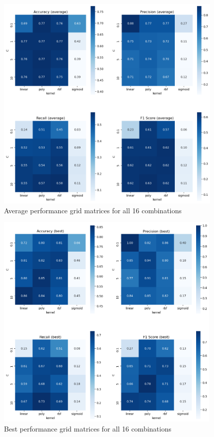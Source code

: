 \documentclass{tron}
\begin{document}
\begin{figure}[H]
\centering
	\includegraphics[height=400px]{../src_code/output/p1/unmodified/Summary_unmodified_average}
	\caption{Average performance grid matrices for all 16 combinations}
	\label{table:performance-grid:avg}
\end{figure}

\begin{figure}[H]
\centering
	\includegraphics[height=400px]{../src_code/output/p1/unmodified/Summary_unmodified_best}
	\caption{Best performance grid matrices for all 16 combinations}
	\label{table:performance-grid:best}
\end{figure}
\end{document}
